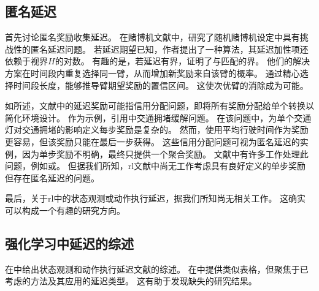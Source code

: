 \subsection{匿名延迟}
\label{subsec:anonymous_delay_related}

首先讨论匿名奖励收集延迟。
在赌博机文献中，\cite{pike2018bandits}研究了随机赌博机设定中具有挑战性的匿名延迟问题。
若延迟期望已知，作者提出了一种算法，其延迟加性项还依赖于视界$H$的对数。
有趣的是，若延迟有界，\cite{pike2018bandits}证明了与\cite{joulani2013online}匹配的界。
他们的解决方案在时间段内重复选择同一臂，从而增加新奖励来自该臂的概率。
通过精心选择时间段长度，\cite{pike2018bandits}能够推导臂期望奖励的置信区间。
这使次优臂的消除成为可能。

如所述，文献中的延迟奖励可能指信用分配问题，即将所有奖励分配给单个转换以简化环境设计。
作为示例，引用\cite{gong2019decentralized}中交通拥堵缓解问题。
在该问题中，为单个交通灯对交通拥堵的影响定义每步奖励是复杂的。
然而，使用平均行驶时间作为奖励更容易，但该奖励只能在最后一步获得。
这些信用分配问题可视为匿名延迟的实例，因为单步奖励不明确，最终只提供一个聚合奖励。
文献中有许多工作处理此问题，例如\cite{arjona2019rudder}或\cite{han2022off}。
但据我们所知，\gls{rl}文献中尚无工作考虑具有良好定义的单步奖励但存在匿名延迟的问题。

最后，关于\gls{rl}中的状态观测或动作执行延迟，据我们所知尚无相关工作。
这确实可以构成一个有趣的研究方向。

\subsection{强化学习中延迟的综述}
在中给出状态观测和动作执行延迟文献的综述。
在中提供类似表格，但聚焦于已考虑的方法及其应用的延迟类型。
这有助于发现缺失的研究结果。


